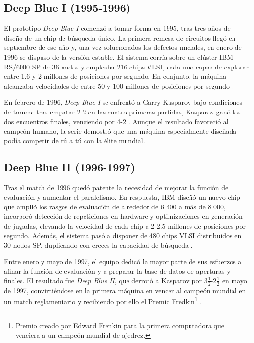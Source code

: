 \documentclass[a4paper, 12pt]{article}
\begin{document}
\subsection{Deep Blue I (1995-1996)}

El prototipo \textit{Deep Blue I} comenzó a tomar forma en 1995, 
tras tres años de diseño de un chip de búsqueda único. La 
primera remesa de circuitos llegó en septiembre de ese año y, 
una vez solucionados los defectos iniciales, en enero de 1996 se 
dispuso de la versión estable. El sistema corría sobre un 
clúster IBM RS/6000 SP de 36 nodos y empleaba 216 chips VLSI, 
cada uno capaz de explorar entre 1.6 y 2 millones de posiciones 
por segundo. En conjunto, la máquina alcanzaba velocidades de 
entre 50 y 100 millones de posiciones por segundo \cite{campbell2002deep}.    

En febrero de 1996, \textit{Deep Blue I} se enfrentó a Garry 
Kasparov bajo condiciones de torneo: tras empatar 2-2 en las 
cuatro primeras partidas, Kasparov ganó los dos encuentros 
finales, venciendo por 4-2 \cite{campbell2002deep}. Aunque el 
resultado favoreció al campeón humano, la serie demostró que una 
máquina especialmente diseñada podía competir de tú a tú con la 
élite mundial.

\subsection{Deep Blue II (1996-1997)}

Tras el match de 1996 quedó patente la necesidad de mejorar la 
función de evaluación y aumentar el paralelismo. En respuesta, 
IBM diseñó un nuevo chip que amplió los rasgos de evaluación de 
alrededor de 6 400 a más de 8 000, incorporó detección de 
repeticiones en hardware y optimizaciones en generación de 
jugadas, elevando la velocidad de cada chip a 2-2.5 millones de 
posiciones por segundo. Además, el sistema pasó a disponer de 
480 chips VLSI distribuidos en 30 nodos SP, duplicando con 
creces la capacidad de búsqueda \cite{campbell2002deep}.

Entre enero y mayo de 1997, el equipo dedicó la mayor parte de 
sus esfuerzos a afinar la función de evaluación y a preparar la 
base de datos de aperturas y finales. El resultado fue 
\textit{Deep Blue II}, que derrotó a Kasparov por 3\(\frac{1}{2}\)-2\(\frac{1}{2}\) en mayo
de 1997, convirtiéndose en la primera máquina en vencer al 
campeón mundial en un match reglamentario y recibiendo por 
ello el Premio Fredkin\footnote{Premio creado por Edward Frenkin para la primera computadora que venciera a un campeón mundial de ajedrez.} \cite{campbell2002deep}.
\end{document}
